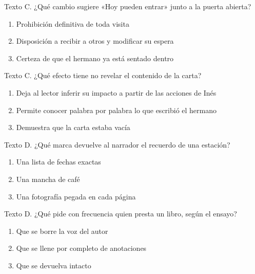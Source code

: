 \noindent\begin{minipage}{\linewidth}\setlength{\parskip}{4pt}\label{q:L-017}
Texto C. ¿Qué cambio sugiere «Hoy pueden entrar» junto a la puerta abierta?
\begin{enumerate}[label=\Alph*),nosep]
\item Prohibición definitiva de toda visita
\item Disposición a recibir a otros y modificar su espera
\item Certeza de que el hermano ya está sentado dentro
\end{enumerate}\end{minipage}\par\medskip

\noindent\begin{minipage}{\linewidth}\setlength{\parskip}{4pt}\label{q:L-018}
Texto C. ¿Qué efecto tiene no revelar el contenido de la carta?
\begin{enumerate}[label=\Alph*),nosep]
\item Deja al lector inferir su impacto a partir de las acciones de Inés
\item Permite conocer palabra por palabra lo que escribió el hermano
\item Demuestra que la carta estaba vacía
\end{enumerate}\end{minipage}\par\medskip

\noindent\begin{minipage}{\linewidth}\setlength{\parskip}{4pt}\label{q:L-019}
Texto D. ¿Qué marca devuelve al narrador el recuerdo de una estación?
\begin{enumerate}[label=\Alph*),nosep]
\item Una lista de fechas exactas
\item Una mancha de café
\item Una fotografía pegada en cada página
\end{enumerate}\end{minipage}\par\medskip

\noindent\begin{minipage}{\linewidth}\setlength{\parskip}{4pt}\label{q:L-020}
Texto D. ¿Qué pide con frecuencia quien presta un libro, según el ensayo?
\begin{enumerate}[label=\Alph*),nosep]
\item Que se borre la voz del autor
\item Que se llene por completo de anotaciones
\item Que se devuelva intacto
\end{enumerate}\end{minipage}\par\medskip

